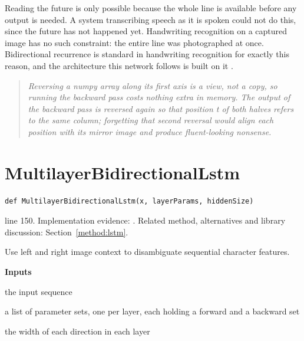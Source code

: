 Reading the future is only possible because the whole line is available before any output is needed. A system transcribing speech as it is spoken could not do this, since the future has not happened yet. Handwriting recognition on a captured image has no such constraint: the entire line was photographed at once. Bidirectional recurrence is standard in handwriting recognition for exactly this reason, and the architecture this network follows is built on it \cite{shi2017}.


\begin{quote}\small\itshape Reversing a numpy array along its first axis is a view, not a copy, so running the backward pass costs nothing extra in memory. The output of the backward pass is reversed again so that position t of both halves refers to the same column; forgetting that second reversal would align each position with its mirror image and produce fluent-looking nonsense.\end{quote}


\section{MultilayerBidirectionalLstm}\label{fn:recognise:MultilayerBidirectionalLstm}
\begin{lstlisting}[style=sig]
def MultilayerBidirectionalLstm(x, layerParams, hiddenSize)
\end{lstlisting}
 line 150. Implementation evidence: \cite{code2026}. Related method, alternatives and library discussion: Section~\ref{method:lstm}.


Use left and right image context to disambiguate sequential character features.




\noindent\textbf{Inputs}
\begin{description}[leftmargin=2.2em,style=nextline,font=\normalfont\ttfamily]\setlength\itemsep{1pt}
  \item[{x}] \normalfont the input sequence
  \item[{layerParams}] \normalfont a list of parameter sets, one per layer, each holding a forward and a backward set
  \item[{hiddenSize}] \normalfont the width of each direction in each layer
\end{description}

